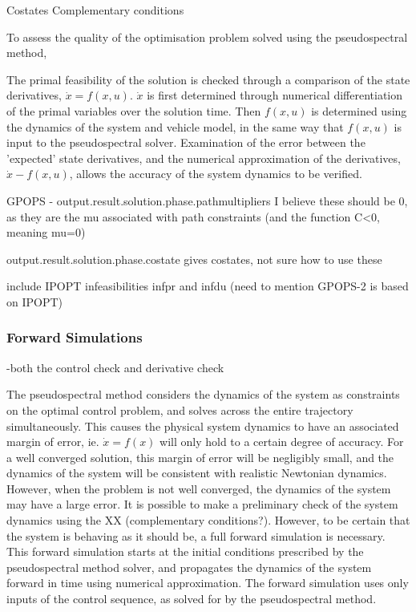Costates
Complementary conditions

To assess the quality of the optimisation problem solved using the pseudospectral method, 


The primal feasibility of the solution is checked through a comparison of the state derivatives, $\dot{x} = f(x,u)$. $\dot{x}$ is first determined through numerical differentiation of the primal variables over the solution time. Then $f(x,u)$ is determined using the dynamics of the system and vehicle model, in the same way that $f(x,u)$ is input to the pseudospectral solver. Examination of the error between the 'expected' state derivatives, and the numerical approximation of the derivatives, $\dot{x} - f(x,u)$, allows the accuracy of the system dynamics to be verified. 


GPOPS - 
output.result.solution.phase.pathmultipliers
I believe these should be 0, as they are the mu associated with path constraints (and the function C<0, meaning mu=0)

output.result.solution.phase.costate
gives costates, not sure how to use these



include IPOPT infeasibilities infpr and infdu
(need to mention GPOPS-2 is based on IPOPT)

\subsubsection{Forward Simulations}
-both the control check and derivative check

The pseudospectral method considers the dynamics of the system as constraints on the optimal control problem, and solves across the entire trajectory simultaneously. This causes the physical system dynamics to have an associated margin of error, ie. $\dot{x} = f(x)$ will only hold to a certain degree of accuracy. For a well converged solution, this margin of error will be negligibly small, and the dynamics of the system will be consistent with realistic Newtonian dynamics. However, when the problem is not well converged, the dynamics of the system may have a large error. It is possible to make a preliminary check of the system dynamics using the XX (complementary conditions?). However, to be certain that the system is behaving as it should be, a full forward simulation is necessary. This forward simulation starts at the initial conditions prescribed by the pseudospectral method solver, and propagates the dynamics of the system forward in time using numerical approximation. The forward simulation uses only inputs of the control sequence, as solved for by the pseudospectral method. 
